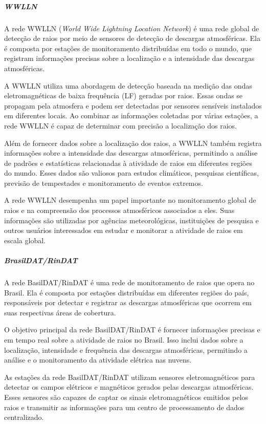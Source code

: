 \documentclass[a4paper, 12pt, onecolumn,singlespacing]{article}
\begin{document}
	\subparagraph{WWLLN}
	
	A rede WWLLN (\textit{World Wide Lightning Location Network}) é uma rede global de detecção de raios por meio de sensores de detecção de descargas atmosféricas. Ela é composta por estações de monitoramento distribuídas em todo o mundo, que registram informações precisas sobre a localização e a intensidade das descargas atmosféricas.
	
	A WWLLN utiliza uma abordagem de detecção baseada na medição das ondas eletromagnéticas de baixa frequência (LF) geradas por raios. Essas ondas se propagam pela atmosfera e podem ser detectadas por sensores sensíveis instalados em diferentes locais. Ao combinar as informações coletadas por várias estações, a rede WWLLN é capaz de determinar com precisão a localização dos raios.
	
	Além de fornecer dados sobre a localização dos raios, a WWLLN também registra informações sobre a intensidade das descargas atmosféricas, permitindo a análise de padrões e estatísticas relacionadas à atividade de raios em diferentes regiões do mundo. Esses dados são valiosos para estudos climáticos, pesquisas científicas, previsão de tempestades e monitoramento de eventos extremos.
	
	A rede WWLLN desempenha um papel importante no monitoramento global de raios e na compreensão dos processos atmosféricos associados a eles. Suas informações são utilizadas por agências meteorológicas, instituições de pesquisa e outros usuários interessados em estudar e monitorar a atividade de raios em escala global.
	
	\subparagraph{BrasilDAT/RinDAT}
	
	A rede BasilDAT/RinDAT é uma rede de monitoramento de raios que opera no Brasil. Ela é composta por estações distribuídas em diferentes regiões do país, responsáveis por detectar e registrar as descargas atmosféricas que ocorrem em suas respectivas áreas de cobertura.
	
	O objetivo principal da rede BasilDAT/RinDAT é fornecer informações precisas e em tempo real sobre a atividade de raios no Brasil. Isso inclui dados sobre a localização, intensidade e frequência das descargas atmosféricas, permitindo a análise e o monitoramento da atividade elétrica nas nuvens.
	
	As estações da rede BasilDAT/RinDAT utilizam sensores eletromagnéticos para detectar os campos elétricos e magnéticos gerados pelas descargas atmosféricas. Esses sensores são capazes de captar os sinais eletromagnéticos emitidos pelos raios e transmitir as informações para um centro de processamento de dados centralizado.
	
\end{document}
